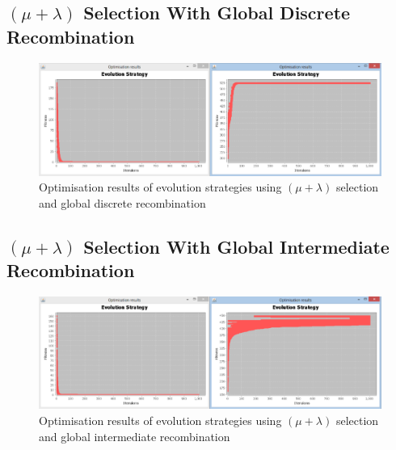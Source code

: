 \begin{landscape}
\subsection{$(\mu+\lambda)$ Selection With Global Discrete Recombination}
\label{sec:appendix17}
  \begin{figure}[h]
    \begin{center}
      \includegraphics{Figures/es_plus_gd}
    \end{center}
    \caption{Optimisation results of evolution strategies using $(\mu+\lambda)$ selection and global discrete recombination}
    \label{fig:phase1}
  \end{figure}
\end{landscape}

\begin{landscape}
\subsection{$(\mu+\lambda)$ Selection With Global Intermediate Recombination}
\label{sec:appendix18}
  \begin{figure}[h]
    \begin{center}
      \includegraphics{Figures/es_plus_gi}
    \end{center}
    \caption{Optimisation results of evolution strategies using $(\mu+\lambda)$ selection and global intermediate recombination}
    \label{fig:phase1}
  \end{figure}
\end{landscape}

